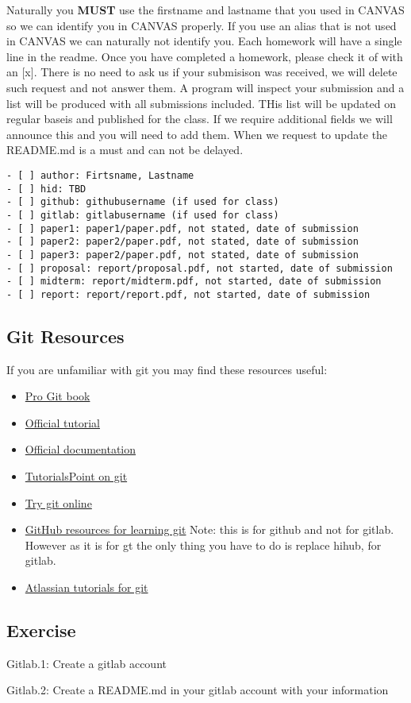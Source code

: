 Naturally you \textbf{MUST} use the firstname and lastname that you used
in CANVAS so we can identify you in CANVAS properly. If you use an alias
that is not used in CANVAS we can naturally not identify you. Each
homework will have a single line in the readme. Once you have completed
a homework, please check it of with an {[}x{]}. There is no need to ask
us if your submisison was received, we will delete such request and not
answer them. A program will inspect your submission and a list will be
produced with all submissions included. THis list will be updated on
regular baseis and published for the class. If we require additional
fields we will announce this and you will need to add them. When we
request to update the README.md is a must and can not be delayed.

\begin{verbatim}
- [ ] author: Firtsname, Lastname
- [ ] hid: TBD
- [ ] github: githubusername (if used for class)
- [ ] gitlab: gitlabusername (if used for class)
- [ ] paper1: paper1/paper.pdf, not stated, date of submission
- [ ] paper2: paper2/paper.pdf, not stated, date of submission
- [ ] paper3: paper2/paper.pdf, not stated, date of submission
- [ ] proposal: report/proposal.pdf, not started, date of submission
- [ ] midterm: report/midterm.pdf, not started, date of submission
- [ ] report: report/report.pdf, not started, date of submission
\end{verbatim}

\subsection{Git Resources}\label{git-resources}

If you are unfamiliar with git you may find these resources useful:

\begin{itemize}
\tightlist
\item
  \href{https://git-scm.com/book/en/v2}{Pro Git book}
\item
  \href{https://git-scm.com/docs/gittutorial}{Official tutorial}
\item
  \href{https://git-scm.com/doc}{Official documentation}
\item
  \href{http://www.tutorialspoint.com/git/}{TutorialsPoint on git}
\item
  \href{https://try.github.io}{Try git online}
\item
  \href{https://help.github.com/articles/good-resources-for-learning-git-and-github/}{GitHub
  resources for learning git} Note: this is for github and not for
  gitlab. However as it is for gt the only thing you have to do is
  replace hihub, for gitlab.
\item
  \href{https://www.atlassian.com/git/tutorials/}{Atlassian tutorials
  for git}
\end{itemize}

\subsection{Exercise}\label{exercise}

Gitlab.1: Create a gitlab account

Gitlab.2: Create a README.md in your gitlab account with your
information
